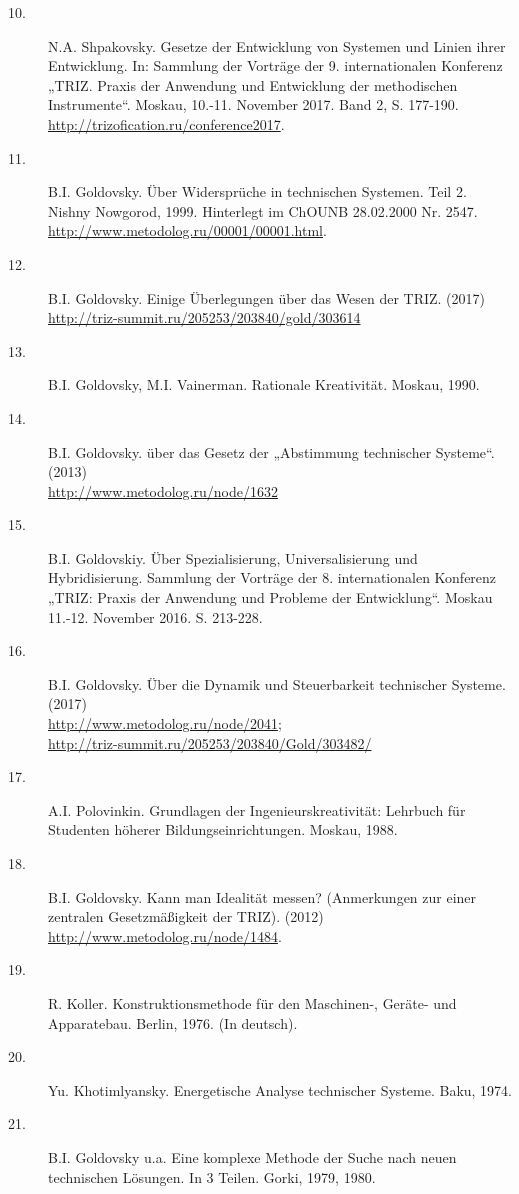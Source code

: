 \documentclass[11pt,a4paper]{article}
\begin{document}
\begin{description}
\item[10.] N.A. Shpakovsky. Gesetze der Entwicklung von Systemen und Linien
  ihrer Entwicklung. In: Sammlung der Vorträge der 9. internationalen
  Konferenz „TRIZ. Praxis der Anwendung und Entwicklung der methodischen
  Instrumente“.  Moskau, 10.-11. November 2017. Band 2, S. 177-190.
  \url{http://trizofication.ru/conference2017}.
\item[11.] B.I. Goldovsky. Über Widersprüche in technischen Systemen. Teil 2.
  Nishny Nowgorod, 1999. Hinterlegt im ChOUNB 28.02.2000 Nr. 2547.\\
  \url{http://www.metodolog.ru/00001/00001.html}.
\item[12.] B.I. Goldovsky. Einige Überlegungen über das Wesen der
  TRIZ. (2017)\\ \url{http://triz-summit.ru/205253/203840/gold/303614}
\item[13.] B.I. Goldovsky, M.I. Vainerman. Rationale Kreativität. Moskau,
  1990.
\item[14.] B.I. Goldovsky. über das Gesetz der „Abstimmung technischer
  Systeme“. (2013)\\ \url{http://www.metodolog.ru/node/1632}
\item[15.] B.I. Goldovskiy. Über Spezialisierung, Universalisierung und
  Hybridisierung. Sammlung der Vorträge der 8. internationalen Konferenz
  „TRIZ: Praxis der Anwendung und Probleme der Entwicklung“. Moskau
  11.-12. November 2016. S. 213-228.
\item[16.] B.I. Goldovsky. Über die Dynamik und Steuerbarkeit technischer
  Systeme. (2017)\\ \url{http://www.metodolog.ru/node/2041};\\
  \url{http://triz-summit.ru/205253/203840/Gold/303482/}
\item[17.] A.I. Polovinkin. Grundlagen der Ingenieurskreativität: Lehrbuch für
  Studenten höherer Bildungseinrichtungen. Moskau, 1988.
\item[18.] B.I. Goldovsky. Kann man Idealität messen? (Anmerkungen zur einer
  zentralen Gesetzmäßigkeit der TRIZ). (2012)
  \url{http://www.metodolog.ru/node/1484}.
\item[19.] R. Koller. Konstruktionsmethode für den Maschinen-, Geräte- und
  Apparatebau. Berlin, 1976. (In deutsch).  
\item[20.] Yu. Khotimlyansky. Energetische Analyse technischer Systeme. Baku,
  1974.
\item[21.] B.I. Goldovsky u.a. Eine komplexe Methode der Suche nach neuen
  technischen Lösungen. In 3 Teilen. Gorki, 1979, 1980.

\end{description}
\end{document}

